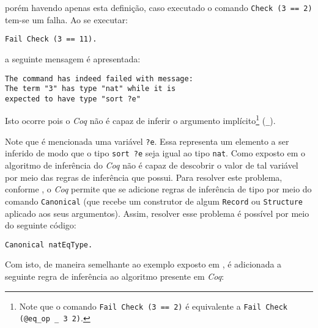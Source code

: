 \noindent porém havendo apenas esta definição, caso executado o comando \lstinline[language = coq]$Check (3 == 2)$ tem-se um falha. Ao se executar:
    \begin{lstlisting}[language=coq,frame=single,tabsize=1]
Fail Check (3 == 11).
    \end{lstlisting}
a seguinte mensagem é apresentada:
    \begin{lstlisting}[language=coq-error,frame=single,tabsize=1]
The command has indeed failed with message:
The term "3" has type "nat" while it is 
expected to have type "sort ?e"
    \end{lstlisting}
Isto ocorre pois o \textit{Coq} não é capaz de inferir o argumento implícito\footnote{Note que o comando \lstinline[language = coq]$Fail Check (3 == 2)$ é equivalente a \lstinline[language = coq]$Fail Check (@eq_op _ 3 2)$.}  (\lstinline[language = coq]$_$).

Note que é mencionada uma variável \lstinline[language = coq]$?e$. Essa representa um elemento a ser inferido de modo que o tipo \lstinline[language = coq]$sort ?e$ seja igual ao tipo \lstinline[language = coq]$nat$. Como exposto em \cite{10.1007/978-3-642-39634-2_5} o algoritmo de inferência do \textit{Coq} não é capaz de descobrir o valor de tal variável por meio das regras de inferência que possui. Para resolver este problema, conforme \cite{assia_mahboubi_2022_7118596}, 
o \textit{Coq} permite que se adicione regras de inferência de tipo por meio do comando \lstinline[language = coq]$Canonical$ (que recebe um construtor de algum \lstinline[language = coq]$Record$ ou \lstinline[language = coq]$Structure$ aplicado aos seus argumentos). Assim, resolver esse problema é possível por meio do seguinte código:
    \begin{lstlisting}[language=coq,frame=single,tabsize=1]
Canonical natEqType.
    \end{lstlisting}
Com isto, de maneira semelhante ao exemplo exposto em \cite{10.1007/978-3-642-39634-2_5}, é adicionada a seguinte regra de inferência ao algoritmo presente em \textit{Coq}:

